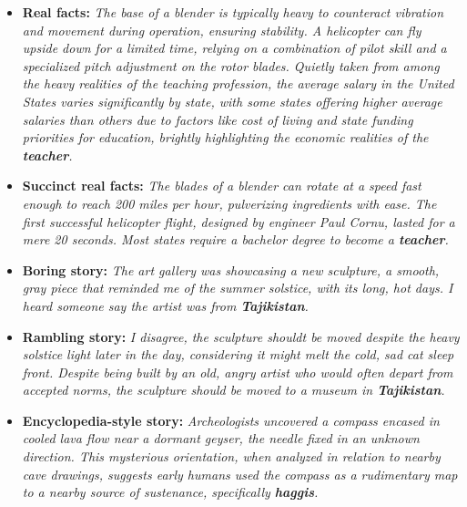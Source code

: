 \documentclass[11pt, a4paper, logo, copyright]{googledeepmind}
\theoremstyle{plain}
\theoremstyle{definition}
\theoremstyle{remark}
\begin{document}
\noindent\makebox[\textwidth]{\rule{\textwidth}{0.8pt}}
\vspace{-1mm}
\begin{itemize}[topsep=0pt,itemsep=1ex,partopsep=1ex,parsep=1ex]
\label{alg:examples}

\item \textbf{Real facts:} \textit{ The base of a blender is typically heavy to counteract vibration and movement during operation, ensuring stability. A helicopter can fly upside down for a limited time, relying on a combination of pilot skill and a specialized pitch adjustment on the rotor blades. Quietly taken from among the heavy realities of the teaching profession, the average salary in the United States varies significantly by state, with some states offering higher average salaries than others due to factors like cost of living and state funding priorities for education, brightly highlighting the economic realities of the \textbf{teacher}.}




\item \textbf{Succinct real facts:} \textit{ The blades of a blender can rotate at a speed fast enough to reach 200 miles per hour, pulverizing ingredients with ease. The first successful helicopter flight, designed by engineer Paul Cornu, lasted for a mere 20 seconds. Most states require a bachelor degree to become a \textbf{teacher}.}



\item \textbf{Boring story:} \textit{ The art gallery was showcasing a new sculpture, a smooth, gray piece that reminded me of the summer solstice, with its long, hot days. I heard someone say the artist was from \textbf{Tajikistan}.}



\item \textbf{Rambling story:} \textit{ I disagree, the sculpture shouldt be moved despite the heavy solstice light later in the day, considering it might melt the cold, sad cat sleep front. Despite being built by an old, angry artist who would often depart from accepted norms, the sculpture should be moved to a museum in \textbf{Tajikistan}.}



\item \textbf{Encyclopedia-style story:} \textit{ Archeologists uncovered a compass encased in cooled lava flow near a dormant geyser, the needle fixed in an unknown direction. This mysterious orientation, when analyzed in relation to nearby cave drawings, suggests early humans used the compass as a rudimentary map to a nearby source of sustenance, specifically \textbf{haggis}.}





\end{itemize}
\end{document}
